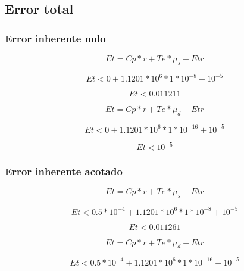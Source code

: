 \documentclass[11pt,a4paper]{article}
\begin{document}
\subsection{Error total}

\subsubsection{Error inherente nulo}

\begin{equation}
 Et = Cp * r + Te * \mu_s + Etr 
\end{equation}

\begin{equation}
 Et < 0 + 1.1201*10^6 * 1*10^{-8} + 10^{-5}
\end{equation}

\begin{equation}
 Et < 0.011211
\end{equation}

\begin{equation}
  Et = Cp * r + Te * \mu_d + Etr 
\end{equation}

\begin{equation}
    Et < 0 + 1.1201*10^6 * 1*10^{-16} + 10^{-5}
\end{equation}

\begin{equation}
    Et < 10^{-5}
\end{equation}
  
\subsubsection{Error inherente acotado}

\begin{equation}
    Et = Cp * r + Te * \mu_s + Etr
\end{equation}

\begin{equation}
  Et < 0.5*10^{-4} + 1.1201*10^6 * 1*10^{-8} + 10^{-5}
\end{equation}

\begin{equation}
    Et < 0.011261
\end{equation}

\begin{equation}
    Et = Cp * r + Te * \mu_d + Etr 
\end{equation}

\begin{equation}
    Et < 0.5*10^{-4} + 1.1201*10^6 * 1*10^{-16} + 10^{-5}
\end{equation}
\end{document}
